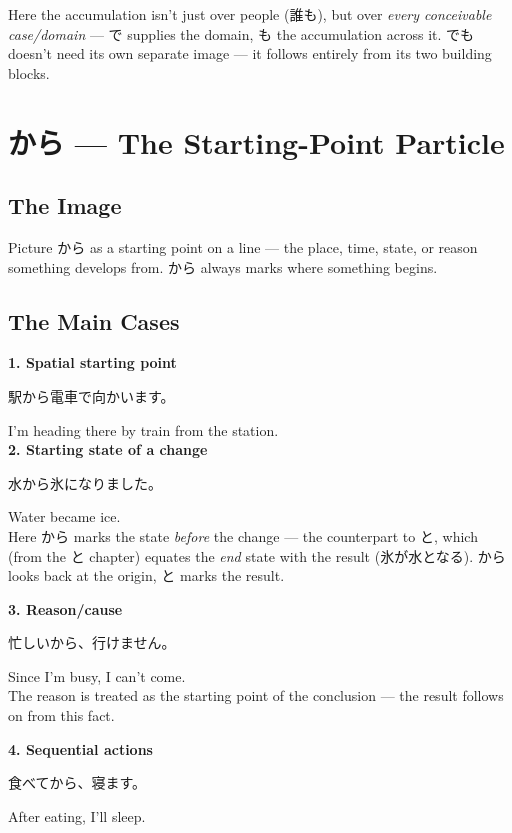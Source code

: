 \documentclass[12pt]{book}
\begin{document}
Here the accumulation isn't just over people (誰も), but over \emph{every conceivable case/domain} — で supplies the domain, も the accumulation across it. でも doesn't need its own separate image — it follows entirely from its two building blocks.


\chapter{から — The Starting-Point Particle}

\section*{The Image}

Picture から as a starting point on a line — the place, time, state, or reason something develops from. から always marks where something begins.

\section*{The Main Cases}

\textbf{1. Spatial starting point}
\par\quad 駅から電車で向かいます。\\
\par\quad I'm heading there by train from the station.\\

\textbf{2. Starting state of a change}
\par\quad 水から氷になりました。\\
\par\quad Water became ice.\\

Here から marks the state \emph{before} the change — the counterpart to と, which (from the と chapter) equates the \emph{end} state with the result (氷が水となる). から looks back at the origin, と marks the result.

\textbf{3. Reason/cause}
\par\quad 忙しいから、行けません。\\
\par\quad Since I'm busy, I can't come.\\

The reason is treated as the starting point of the conclusion — the result follows on from this fact.

\textbf{4. Sequential actions}
\par\quad 食べてから、寝ます。\\
\par\quad After eating, I'll sleep.\\
\end{document}
